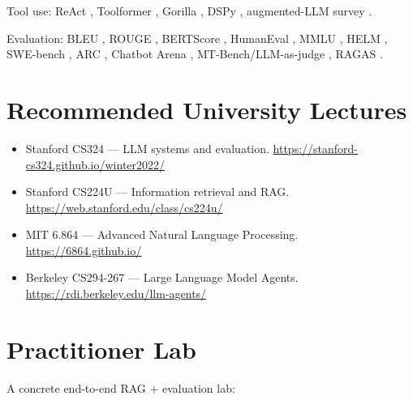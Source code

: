 Tool use: ReAct \citep{yao2023react}, Toolformer
\citep{schick2023toolformer}, Gorilla \citep{patil2023gorilla},
DSPy \citep{khattab2023dspy}, augmented-LLM survey
\citep{mialon2023augmented}.

Evaluation: BLEU \citep{papineni2002bleu}, ROUGE
\citep{lin2004rouge}, BERTScore \citep{zhang2020bertscore},
HumanEval \citep{chen2021humaneval}, MMLU \citep{hendrycks2021mmlu},
HELM \citep{liang2023helm}, SWE-bench \citep{jimenez2024swebench},
ARC \citep{chollet2019arc}, Chatbot Arena \citep{chiang2024arena},
MT-Bench/LLM-as-judge \citep{zheng2023llmjudge},
RAGAS \citep{es2024ragas}.

\section{Recommended University Lectures}

\begin{itemize}
  \item Stanford CS324 --- LLM systems and evaluation.
        \url{https://stanford-cs324.github.io/winter2022/}
  \item Stanford CS224U --- Information retrieval and RAG.
        \url{https://web.stanford.edu/class/cs224u/}
  \item MIT 6.864 --- Advanced Natural Language Processing.
        \url{https://6864.github.io/}
  \item Berkeley CS294-267 --- Large Language Model Agents.
        \url{https://rdi.berkeley.edu/llm-agents/}
\end{itemize}

\section{Practitioner Lab}

A concrete end-to-end RAG + evaluation lab:


